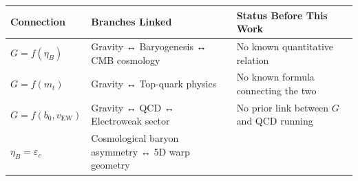 \documentclass[
  11pt,
]{article}
\begin{document}
\begin{longtable}[]{@{}lll@{}}
\toprule
\begin{minipage}[b]{0.19\columnwidth}\raggedright
Connection\strut
\end{minipage} & \begin{minipage}[b]{0.30\columnwidth}\raggedright
Branches Linked\strut
\end{minipage} & \begin{minipage}[b]{0.42\columnwidth}\raggedright
Status Before This Work\strut
\end{minipage}\tabularnewline
\midrule
\endhead
\begin{minipage}[t]{0.19\columnwidth}\raggedright
\(G = f(\eta_B)\)\strut
\end{minipage} & \begin{minipage}[t]{0.30\columnwidth}\raggedright
Gravity ↔ Baryogenesis ↔ CMB cosmology\strut
\end{minipage} & \begin{minipage}[t]{0.42\columnwidth}\raggedright
No known quantitative relation\strut
\end{minipage}\tabularnewline
\begin{minipage}[t]{0.19\columnwidth}\raggedright
\(G = f(m_t)\)\strut
\end{minipage} & \begin{minipage}[t]{0.30\columnwidth}\raggedright
Gravity ↔ Top-quark physics\strut
\end{minipage} & \begin{minipage}[t]{0.42\columnwidth}\raggedright
No known formula connecting the two\strut
\end{minipage}\tabularnewline
\begin{minipage}[t]{0.19\columnwidth}\raggedright
\(G = f(b_0, v_{\text{EW}})\)\strut
\end{minipage} & \begin{minipage}[t]{0.30\columnwidth}\raggedright
Gravity ↔ QCD ↔ Electroweak sector\strut
\end{minipage} & \begin{minipage}[t]{0.42\columnwidth}\raggedright
No prior link between \(G\) and QCD running\strut
\end{minipage}\tabularnewline
\begin{minipage}[t]{0.19\columnwidth}\raggedright
\(\eta_B = \varepsilon_c\)\strut
\end{minipage} & \begin{minipage}[t]{0.30\columnwidth}\raggedright
Cosmological baryon asymmetry ↔ 5D warp geometry\strut

\end{minipage}
\end{longtable}
\end{document}
